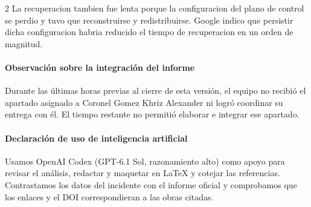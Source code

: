 \documentclass[10pt]{article}
\begin{document}
\begin{multicols}{2}
La recuperacion tambien fue lenta porque la configuracion del plano de control se perdio y
tuvo que reconstruirse y redistribuirse. Google indico que persistir dicha configuracion
habria reducido el tiempo de recuperacion en un orden de magnitud. \cite{googlecloud19009}

\paragraph*{Observación sobre la integración del informe}
Durante las últimas horas previas al cierre de esta versión, el equipo no recibió el apartado asignado a Coronel Gomez Khriz Alexander ni logró coordinar su entrega con él. El tiempo restante no permitió elaborar e integrar ese apartado.

\paragraph*{Declaración de uso de inteligencia artificial}
Usamos OpenAI Codex (GPT-6.1 Sol, razonamiento alto) como apoyo para revisar el análisis, redactar y maquetar en LaTeX y cotejar las referencias. Contrastamos los datos del incidente con el informe oficial y comprobamos que los enlaces y el DOI correspondieran a las obras citadas.

\printbibliography

\end{multicols}
\endgroup
\end{document}
